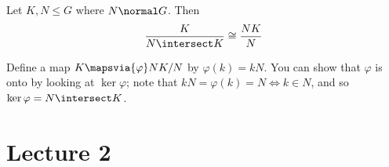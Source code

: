 
Let \(K, N \leq G\) where \(N \normal G\). Then
\begin{align*}
\frac K {N \intersect K} \cong \frac {NK} N
\end{align*} 


Define a map \(K \mapsvia{\varphi} NK/N\) by \(\varphi(k) = kN\). You
can show that \(\varphi\) is onto by looking at \(\ker \varphi\); note
that \(kN = \varphi(k) = N \iff k \in N\), and so
\(\ker \varphi = N \intersect K\). 

\hypertarget{lecture-2}{%
\section{Lecture 2}\label{lecture-2}}





